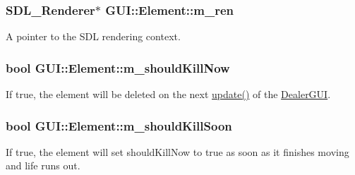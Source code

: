 \hypertarget{classGUI_1_1Element_a32340ae04789b6ea8037fdb1fb440ae1}{
\subsubsection[{m\-\_\-ren}]{\setlength{\rightskip}{0pt plus 5cm}S\-D\-L\-\_\-\-Renderer$\ast$ G\-U\-I\-::\-Element\-::m\-\_\-ren\hspace{0.3cm}{\ttfamily [protected]}}}\label{classGUI_1_1Element_a32340ae04789b6ea8037fdb1fb440ae1}


A pointer to the S\-D\-L rendering context. 

\hypertarget{classGUI_1_1Element_ac3c14a4ae96ff31f2e0a59b6ebc1d076}{
\subsubsection[{m\-\_\-should\-Kill\-Now}]{\setlength{\rightskip}{0pt plus 5cm}bool G\-U\-I\-::\-Element\-::m\-\_\-should\-Kill\-Now\hspace{0.3cm}{\ttfamily [protected]}}}\label{classGUI_1_1Element_ac3c14a4ae96ff31f2e0a59b6ebc1d076}


If true, the element will be deleted on the next \hyperlink{classGUI_1_1Element_ac33ecb92a9f9cb810bea83f31e4c14c9}{update()} of the \hyperlink{classGUI_1_1DealerGUI}{Dealer\-G\-U\-I}. 

\hypertarget{classGUI_1_1Element_a5a4b537de0a51fa11eb4c59b43980092}{
\subsubsection[{m\-\_\-should\-Kill\-Soon}]{\setlength{\rightskip}{0pt plus 5cm}bool G\-U\-I\-::\-Element\-::m\-\_\-should\-Kill\-Soon\hspace{0.3cm}{\ttfamily [protected]}}}\label{classGUI_1_1Element_a5a4b537de0a51fa11eb4c59b43980092}


If true, the element will set should\-Kill\-Now to true as soon as it finishes moving and life runs out. 

